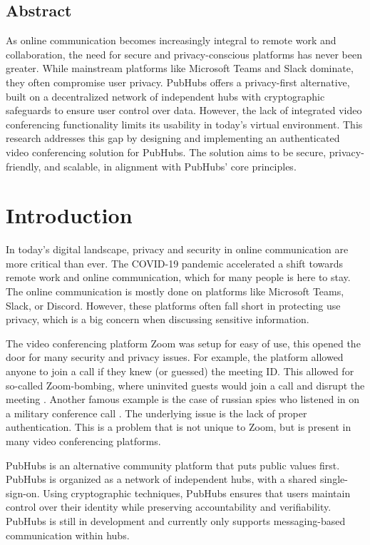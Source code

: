 \documentclass{report}
\begin{document}
\section*{Abstract}
As online communication becomes increasingly integral to remote work and collaboration, the need for secure and
privacy-conscious platforms has never been greater. While mainstream platforms like Microsoft Teams and Slack
dominate, they often compromise user privacy. PubHubs offers a  privacy-first alternative, built on a decentralized
network of independent hubs with cryptographic safeguards to ensure user control over data. However, the lack of
integrated video conferencing functionality limits its usability in today’s virtual environment. This research
addresses this gap by designing and implementing an authenticated video conferencing solution for PubHubs. The
solution aims to be secure, privacy-friendly, and scalable, in alignment with PubHubs’ core principles.


\tableofcontents
\chapter{Introduction}
In today's digital landscape, privacy and security in online communication are more critical than ever.
The COVID-19 pandemic accelerated a shift towards remote work and online communication, which for many people is here to stay.
The online communication is mostly done on platforms like Microsoft Teams, Slack, or Discord.
However, these platforms often fall short in protecting use privacy, which is a big concern when discussing sensitive
information.

The video conferencing platform Zoom was setup for easy of use, this opened the door for many security and privacy
issues. For example, the platform allowed anyone to join a call if they knew (or guessed) the meeting ID. This
allowed for so-called Zoom-bombing, where uninvited guests would join a call and disrupt the meeting \cite{ling_first_2021}.
Another famous example is the case of russian spies who listened in on a military conference call \cite{
schmitz_germany_2024}. The underlying issue is the lack of proper authentication. This is a problem that is not
unique to Zoom, but is present in many video conferencing platforms.

PubHubs is an alternative community platform that puts public values first.
PubHubs is organized as a network of independent hubs, with a shared single-sign-on.
Using cryptographic techniques, PubHubs ensures that users maintain control over their identity while preserving
accountability and verifiability. PubHubs is still in development and currently only supports messaging-based
communication within hubs.
\end{document}
